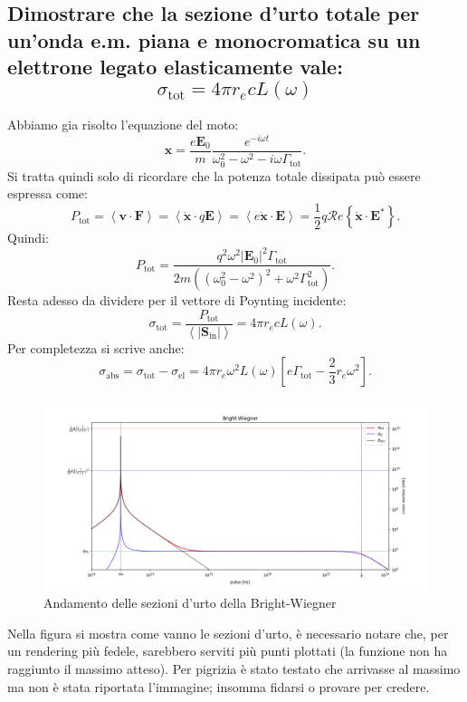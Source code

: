 \subsection[]{Dimostrare che la sezione d’urto totale per un’onda e.m. piana e monocromatica su un elettrone legato elasticamente vale:
\[
		\sigma_{\text{tot}} = 4 \pi r_{e} c L\left( \omega \right)
\] 
}
Abbiamo gia risolto l'equazione del moto:
\[
\boldsymbol{x}= \frac{e \boldsymbol{E}_0}{m} \frac{e^{- i \omega t}}{\omega _0^2 - \omega ^2 - i \omega \Gamma_{\text{tot}}}
.\] 
Si tratta quindi solo di ricordare che la potenza totale dissipata può essere espressa come:
\[
	P_{\text{tot}} = \left<\boldsymbol{v} \cdot \boldsymbol{F} \right> = \left<\dot{\boldsymbol{x}}\cdot q \boldsymbol{E} \right> = \left< e \dot{\boldsymbol{x}} \cdot \boldsymbol{E} \right> = \frac{1}{2} q \mathcal{R}e \left\{ \dot{\boldsymbol{x}} \cdot \boldsymbol{E}^* \right\} 
.\]
Quindi:
\[
	P_{\text{tot}} = \frac{q^2 \omega ^2 \left| \boldsymbol{E}_0 \right|^2 \Gamma_{\text{tot}}}{2m\left( \left(\omega _0^2 - \omega ^2 \right) ^2 + \omega ^2 \Gamma_{\text{tot}}^2  \right) }
.\] 
Resta adesso da dividere per il vettore di Poynting incidente:
\[
\sigma_{\text{tot}} = \frac{P_{\text{tot}}}{\left<\left| \boldsymbol{S}_{\text{in}} \right|\right>} = 4 \pi r_{e} c L\left( \omega \right) 
.\] 
Per completezza si scrive anche:
\[
\sigma_{\text{abs}} = \sigma_{\text{tot}} - \sigma_{\text{el}} = 4 \pi r_{e} \omega^2 L\left( \omega \right) \left[ e \Gamma_{\text{tot}} - \frac{2}{3}r_e \omega^2 \right]
.\] 
\begin{figure}[H]
	\centering
	\includegraphics[width=1.1\textwidth]{immagini/b-w.png}
	\caption{Andamento delle sezioni d'urto della Bright-Wiegner}
	\label{fig:Andamento Bright-Wiegner}
\end{figure}
Nella figura si mostra come vanno le sezioni d'urto, è necessario notare che, per un rendering più fedele, sarebbero serviti più punti plottati (la funzione non ha raggiunto il massimo atteso). Per pigrizia è stato testato che arrivasse al massimo ma non è stata riportata l'immagine; insomma fidarsi o provare per credere.

